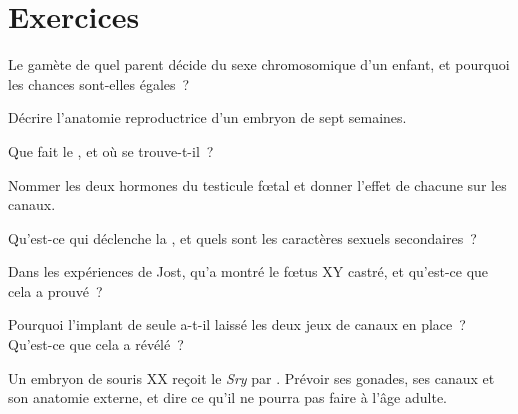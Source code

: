 \section{Exercices}

\begin{exercise}[$\star$]\label{exo:g11:becoming-male-female:1}
Le gamète de quel parent décide du sexe chromosomique d'un enfant, et
pourquoi les chances sont-elles égales~?
\end{exercise}

\begin{exercise}[$\star$]\label{exo:g11:becoming-male-female:2}
Décrire l'anatomie reproductrice d'un embryon de sept semaines.
\end{exercise}

\begin{exercise}[$\star$]\label{exo:g11:becoming-male-female:3}
Que fait le , et où se trouve-t-il~?
\end{exercise}

\begin{exercise}[$\star$]\label{exo:g11:becoming-male-female:4}
Nommer les deux hormones du testicule fœtal et donner l'effet de
chacune sur les canaux.
\end{exercise}

\begin{exercise}[$\star$]\label{exo:g11:becoming-male-female:5}
Qu'est-ce qui déclenche la , et quels sont les caractères
sexuels secondaires~?
\end{exercise}

\begin{exercise}[$\star\star$]\label{exo:g11:becoming-male-female:6}
Dans les expériences de Jost, qu'a montré le fœtus XY castré, et
qu'est-ce que cela a prouvé~?
\end{exercise}

\begin{exercise}[$\star\star$]\label{exo:g11:becoming-male-female:7}
Pourquoi l'implant de  seule a-t-il laissé les deux jeux de
canaux en place~? Qu'est-ce que cela a révélé~?
\end{exercise}

\begin{exercise}[$\star\star$]\label{exo:g11:becoming-male-female:8}
Un embryon de souris XX reçoit le  \emph{Sry} par .
Prévoir ses gonades, ses canaux et son anatomie externe, et dire ce
qu'il ne pourra pas faire à l'âge adulte.
\end{exercise}

